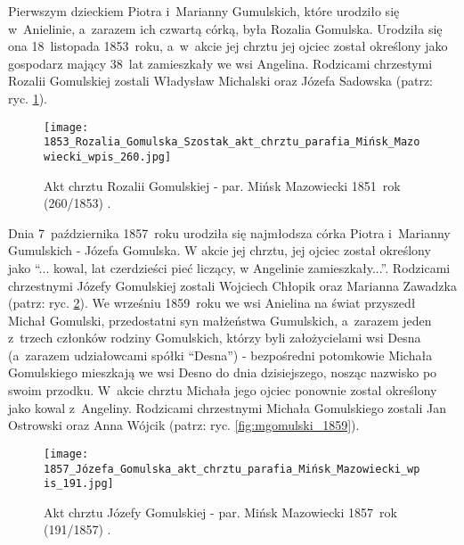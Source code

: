 Pierwszym dzieckiem Piotra i~Marianny Gumulskich, które urodziło się
w~Anielinie, a~zarazem ich czwartą córką, była Rozalia Gomulska. Urodziła się
ona 18~listopada 1853~roku, a~w~akcie jej chrztu jej ojciec został określony 
jako gospodarz mający 38~lat zamieszkały we wsi Angelina. Rodzicami chrzestymi 
Rozalii Gomulskiej zostali Władysław Michalski oraz Józefa Sadowska 
(patrz: ryc. \ref{fig:rgomulska_1853}).

\begin{figure}[!ht]
    \vspace*{0.5cm}
    \centering \texttt{[image: 
        1853\_Rozalia\_Gomulska\_Szostak\_akt\_chrztu\_parafia\_Mińsk\_Mazowiecki\_wpis\_260.jpg]}
    \captionsetup{format=hang}
    \caption{Akt chrztu Rozalii Gomulskiej - par. Mińsk Mazowiecki 1851~rok 
    (260/1853) \cite{par_minsk2}.}
    \label{fig:rgomulska_1853}
\end{figure}

Dnia 7~października 1857~roku urodziła się najmłodsza córka Piotra i~Marianny
Gumulskich - Józefa Gomulska. W akcie jej chrztu, jej ojciec został określony 
jako \enquote{... kowal, lat czerdzieści pieć liczący, w Angelinie
zamieszkały...}. Rodzicami chrzestnymi Józefy Gomulskiej zostali Wojciech
Chłopik oraz Marianna Zawadzka (patrz: ryc. \ref{fig:jgomulska_1857}). We 
wrześniu 1859~roku we wsi Anielina na świat przyszedł Michał Gomulski, 
przedostatni syn małżeństwa Gumulskich, a~zarazem jeden z~trzech członków
rodziny Gomulskich, którzy byli założycielami wsi Desna (a~zarazem
udziałowcami spółki \enquote{Desna}) - bezpośredni potomkowie Michała 
Gomulskiego mieszkają we wsi Desno do dnia dzisiejszego, nosząc nazwisko po 
swoim przodku. W~akcie chrztu Michała jego ojciec ponownie zostal określony 
jako kowal z~Angeliny. Rodzicami chrzestnymi Michała Gomulskiego zostali Jan 
Ostrowski oraz Anna Wójcik (patrz: ryc. \ref{fig:mgomulski_1859}). 

\begin{figure}[!ht]
    \vspace*{0.5cm}
    \centering \texttt{[image: 
        1857\_Józefa\_Gomulska\_akt\_chrztu\_parafia\_Mińsk\_Mazowiecki\_wpis\_191.jpg]}
    \captionsetup{format=hang}
    \caption{Akt chrztu Józefy Gomulskiej - par. Mińsk Mazowiecki 1857~rok 
    (191/1857) \cite{par_minsk2}.}
    \label{fig:jgomulska_1857}
\end{figure}

